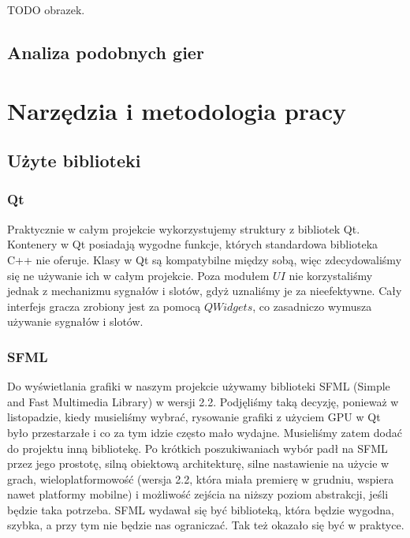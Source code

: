 \documentclass[licencjacka]{pracamgr}
\begin{document}
    TODO obrazek.

  \section{Analiza podobnych gier}

\chapter{Narzędzia i metodologia pracy}
  \section{Użyte biblioteki}
    \subsection{Qt}
    Praktycznie w całym projekcie wykorzystujemy struktury z bibliotek Qt. Kontenery w Qt posiadają wygodne funkcje,
    których standardowa biblioteka C++ nie oferuje. Klasy w Qt są kompatybilne między sobą, więc zdecydowaliśmy się ne
    używanie ich w całym projekcie. Poza modułem $UI$ nie korzystaliśmy jednak z mechanizmu sygnałów i slotów, gdyż
    uznaliśmy je za nieefektywne. Cały interfejs gracza zrobiony jest za pomocą $QWidgets$, co zasadniczo wymusza
    używanie sygnałów i slotów.

    \subsection{SFML}
    Do wyświetlania grafiki w naszym projekcie używamy biblioteki SFML (Simple and Fast Multimedia Library) w wersji
    2.2. Podjęliśmy taką decyzję, ponieważ w listopadzie, kiedy musieliśmy wybrać, rysowanie grafiki z użyciem GPU w Qt
    było przestarzałe i co za tym idzie często mało wydajne. Musieliśmy zatem dodać do projektu inną bibliotekę. Po
    krótkich poszukiwaniach wybór padł na SFML przez jego prostotę, silną obiektową architekturę, silne nastawienie na
    użycie w grach, wieloplatformowość (wersja 2.2, która miała premierę w grudniu, wspiera nawet platformy mobilne) i
    możliwość zejścia na niższy poziom abstrakcji, jeśli będzie taka potrzeba. SFML wydawał się być biblioteką, która
    będzie wygodna, szybka, a przy tym nie będzie nas ograniczać. Tak też okazało się być w praktyce.
\end{document}
